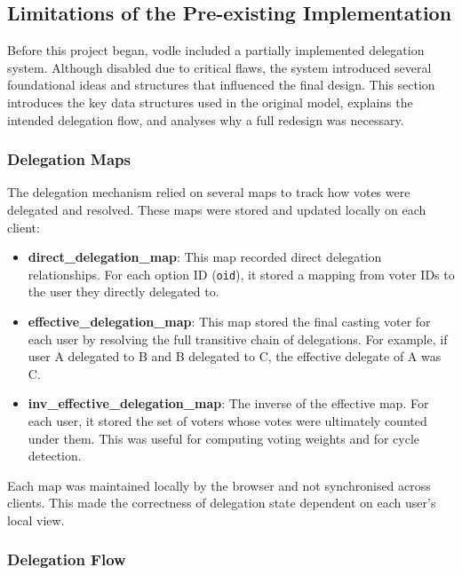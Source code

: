 \subsection{Limitations of the Pre-existing Implementation}

Before this project began, vodle included a partially implemented delegation system. Although disabled due to critical flaws, the system introduced several foundational ideas and structures that influenced the final design. This section introduces the key data structures used in the original model, explains the intended delegation flow, and analyses why a full redesign was necessary.

\subsubsection*{Delegation Maps}

The delegation mechanism relied on several maps to track how votes were delegated and resolved. These maps were stored and updated locally on each client:

\begin{itemize}
    \item \textbf{direct\_delegation\_map}: This map recorded direct delegation relationships. For each option ID (\texttt{oid}), it stored a mapping from voter IDs to the user they directly delegated to.

    \item \textbf{effective\_delegation\_map}: This map stored the final casting voter for each user by resolving the full transitive chain of delegations. For example, if user A delegated to B and B delegated to C, the effective delegate of A was C.

    \item \textbf{inv\_effective\_delegation\_map}: The inverse of the effective map. For each user, it stored the set of voters whose votes were ultimately counted under them. This was useful for computing voting weights and for cycle detection.
\end{itemize}

Each map was maintained locally by the browser and not synchronised across clients. This made the correctness of delegation state dependent on each user's local view.

\subsubsection*{Delegation Flow}


